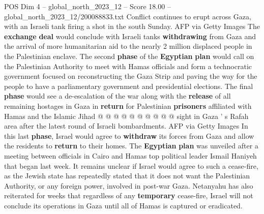 \begin{textsample}{POS Dim 4 – global\_north\_2023\_12 – Score 18.00 – global\_north\_2023\_12/200088833.txt}
Conflict continues to erupt across Gaza, with an Israeli tank firing a shot in the south Sunday.
AFP via Getty Images The \textbf{exchange} \textbf{deal} would conclude with Israeli tanks \textbf{withdrawing} from Gaza and the arrival of more humanitarian aid to the nearly 2 million displaced people in the Palestinian enclave.
The second \textbf{phase} of the \textbf{Egyptian} \textbf{plan} would call on the Palestinian Authority to meet with Hamas officials and form a technocratic government focused on reconstructing the Gaza Strip and paving the way for the people to have a parliamentary government and presidential elections.
The final \textbf{phase} would see a de-escalation of the war along with the \textbf{release} of all remaining hostages in Gaza in \textbf{return} for Palestinian \textbf{prisoners} affiliated with Hamas and the Islamic Jihad @ @ @ @ @ @ @ @ @ @ sight in Gaza ' s Rafah area after the latest round of Israeli bombardments.
AFP via Getty Images In this last \textbf{phase}, Israel would agree to \textbf{withdraw} its forces from Gaza and allow the residents to \textbf{return} to their homes.
The \textbf{Egyptian} \textbf{plan} was unveiled after a meeting between officials in Cairo and Hamas top political leader Ismail Haniyeh that began last week.
It remains unclear if Israel would agree to such a cease-fire, as the Jewish state has repeatedly stated that it does not want the Palestinian Authority, or any foreign power, involved in post-war Gaza.
Netanyahu has also reiterated for weeks that regardless of any \textbf{temporary} cease-fire, Israel will not conclude its operations in Gaza until all of Hamas is captured or eradicated.

\end{textsample}
